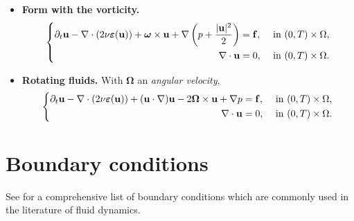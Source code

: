 \documentclass[oneside,11pt]{book}
\numberwithin{equation}{section}
\newtheorem{remark}{Remark}[section]
\begin{document}
\begin{itemize}
    \begin{remark}
        The system \eqref{incompressible instationary NSEs: conservative form} indicates that the general incompressible instationary Navier-Stokes equations can be considered as a \emph{conservative law} of the form
        \begin{equation*}
            \left\{\begin{split}
                \partial_t{\bf u} + \nabla\cdot P({\bf u},p) &= 0,&&\mbox{ in }(0,T)\times\Omega,\\
                \nabla\cdot{\bf u} &= 0,&&\mbox{ in }(0,T)\times\Omega.
            \end{split}\right.
        \end{equation*}
        Thus standard techniques of conservation laws can be then applied to study \eqref{incompressible instationary NSEs: basic form}, see, e.g., \cite{LeVeque2002}.
    \end{remark}
    \item \textbf{Form with the vorticity.}
    \begin{equation}
        \label{incompressible instationary NSEs: vorticity form}
        \left\{\begin{split}
            \partial_t{\bf u} - \nabla\cdot(2\nu\boldsymbol{\varepsilon}({\bf u})) + \boldsymbol{\omega}\times{\bf u} + \nabla\left(p + \frac{|{\bf u}|^2}{2}\right) &= {\bf f},&&\mbox{ in }(0,T)\times\Omega,\\
            \nabla\cdot{\bf u} &= 0,&&\mbox{ in }(0,T)\times\Omega.
        \end{split}\right.
    \end{equation}
    \item \textbf{Rotating fluids.} With $\boldsymbol{\Omega}$ an \textit{angular velocity},
    \begin{equation}
        \label{incompressible instationary NSEs: rotating fluid}
        \left\{\begin{split}
            \partial_t{\bf u} - \nabla\cdot(2\nu\boldsymbol{\varepsilon}({\bf u})) + ({\bf u}\cdot\nabla){\bf u} - 2\boldsymbol{\Omega}\times{\bf u} + \nabla p &= {\bf f},&&\mbox{ in }(0,T)\times\Omega,\\
            \nabla\cdot{\bf u} &= 0,&&\mbox{ in }(0,T)\times\Omega.
        \end{split}\right.
    \end{equation}
\end{itemize}

\section{Boundary conditions}
See \cite[Sect. 2.7]{Rebollo_Lewandowski2014} for a comprehensive list of boundary conditions which are commonly used in the literature of fluid dynamics.
\end{document}
